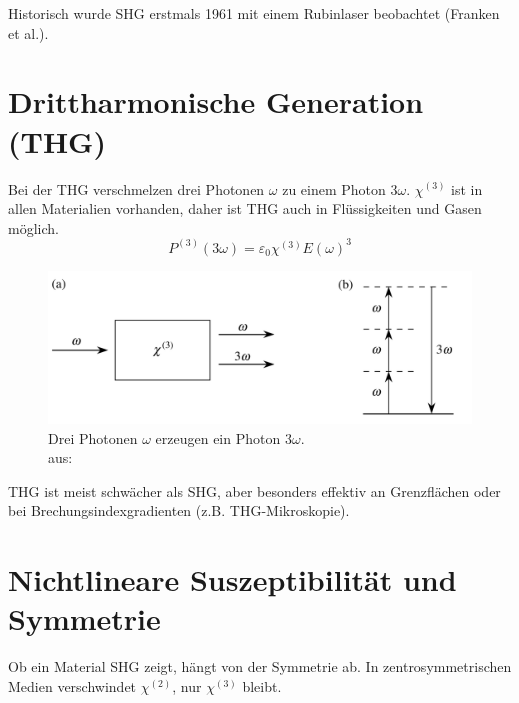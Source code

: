 \documentclass[9pt,a4paper,twocolumn,twoside]{tau-class/tau}
\newcommand{\figciteweb}[1]{\\[-3mm]{\tiny aus: \citeauthortitle{#1}}}
\begin{document}
Historisch wurde SHG erstmals 1961 mit einem Rubinlaser beobachtet (Franken et al.).


\section{Drittharmonische Generation (THG)}
Bei der THG verschmelzen drei Photonen $\omega$ zu einem Photon $3\omega$. $\chi^{(3)}$ ist in allen Materialien vorhanden, daher ist THG auch in Flüssigkeiten und Gasen möglich.
\begin{equation}
P^{(3)}(3\omega) = \varepsilon_0 \chi^{(3)} E(\omega)^3
\end{equation}

\begin{figure}[!ht]
\centering
\includegraphics[width=0.95\columnwidth]{../praes/Images/thg.png}
\caption{Drei Photonen $\omega$ erzeugen ein Photon $3\omega$.\figciteweb{Boyd2020}}
\end{figure}

THG ist meist schwächer als SHG, aber besonders effektiv an Grenzflächen oder bei Brechungsindexgradienten (z.B. THG-Mikroskopie).


\section{Nichtlineare Suszeptibilität und Symmetrie}
Ob ein Material SHG zeigt, hängt von der Symmetrie ab. In zentrosymmetrischen Medien verschwindet $\chi^{(2)}$, nur $\chi^{(3)}$ bleibt.
\end{document}
